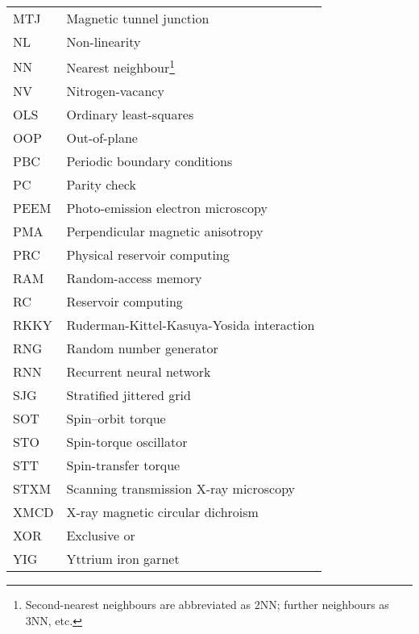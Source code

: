 {\begin{longtable}[l]{ll}
        MTJ   & Magnetic tunnel junction                    \\
        NL    & Non-linearity                               \\
        NN    & Nearest neighbour\footnote{Second-nearest neighbours are abbreviated as 2NN; further neighbours as 3NN, etc.} \\
        NV    & Nitrogen-vacancy                            \\
        OLS   & Ordinary least-squares                      \\
        OOP   & Out-of-plane                                \\
        PBC   & Periodic boundary conditions                \\
        PC    & Parity check                                \\
        PEEM  & Photo-emission electron microscopy          \\
        PMA   & Perpendicular magnetic anisotropy           \\
        PRC   & Physical reservoir computing                \\
        RAM   & Random-access memory                        \\
        RC    & Reservoir computing                         \\
        RKKY  & Ruderman-Kittel-Kasuya-Yosida interaction   \\
        RNG   & Random number generator                     \\
        RNN   & Recurrent neural network                    \\
        SJG   & Stratified jittered grid                    \\
        SOT   & Spin--orbit torque                           \\
        STO   & Spin-torque oscillator                      \\
        STT   & Spin-transfer torque                        \\
        STXM  & Scanning transmission X-ray microscopy      \\
        XMCD  & X-ray magnetic circular dichroism           \\
        XOR   & Exclusive or                                \\
        YIG   & Yttrium iron garnet                         \\
    \end{longtable}
}

